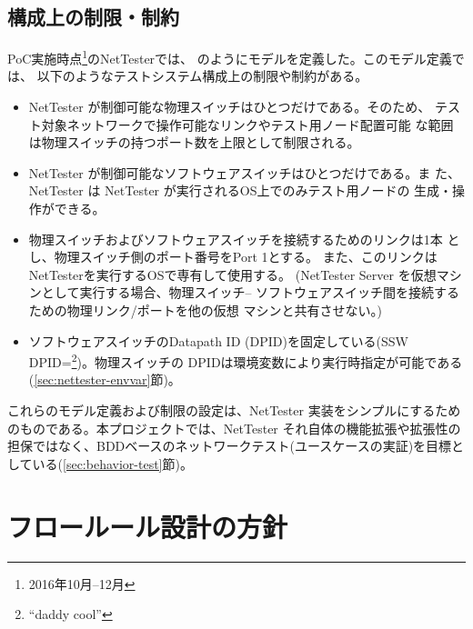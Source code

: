   \subsection{構成上の制限・制約}
  \label{sec:nettester-model-restriction}

PoC実施時点\footnote{2016年10月--12月}のNetTesterでは、
のようにモデルを定義した。このモデル定義では、
以下のようなテストシステム構成上の制限や制約がある。
\begin{itemize}
 \item NetTester が制御可能な物理スイッチはひとつだけである。そのため、
       テスト対象ネットワークで操作可能なリンクやテスト用ノード配置可能
       な範囲は物理スイッチの持つポート数を上限として制限される。
 \item NetTester が制御可能なソフトウェアスイッチはひとつだけである。ま
       た、NetTester は NetTester が実行されるOS上でのみテスト用ノードの
       生成・操作ができる。
 \item 物理スイッチおよびソフトウェアスイッチを接続するためのリンクは1本
       とし、物理スイッチ側のポート番号をPort 1とする。
       また、このリンクはNetTesterを実行するOSで専有して使用する。
       (NetTester Server を仮想マシンとして実行する場合、物理スイッチ--
       ソフトウェアスイッチ間を接続するための物理リンク/ポートを他の仮想
       マシンと共有させない。)
 \item ソフトウェアスイッチのDatapath ID (DPID)を固定している(SSW
       DPID=\footnote{``daddy cool''})。物理スイッチの
       DPIDは環境変数により実行時指定が可能である
       (\ref{sec:nettester-envvar}節)。
\end{itemize}
これらのモデル定義および制限の設定は、NetTester 実装をシンプルにするため
のものである。本プロジェクトでは、NetTester それ自体の機能拡張や拡張性の
担保ではなく、BDDベースのネットワークテスト(ユースケースの実証)を目標と
している(\ref{sec:behavior-test}節)。

 \section{フロールール設計の方針}
 \label{sec:flow-design-policy}

